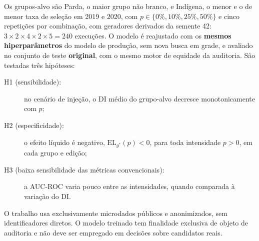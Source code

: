Os grupos-alvo são Parda, o maior grupo não branco, e Indígena, o menor e o de menor taxa de seleção em 2019 e 2020, com $p \in \{0\%, 10\%, 25\%, 50\%\}$ e cinco repetições por combinação, com geradores derivados da semente 42: $3 \times 2 \times 4 \times 2 \times 5 = 240$ execuções. O modelo é reajustado com os \textbf{mesmos hiperparâmetros} do modelo de produção, sem nova busca em grade, e avaliado no conjunto de teste \textbf{original}, com o mesmo motor de equidade da auditoria. São testadas três hipóteses:
\begin{description}
    \item[H1 (sensibilidade):] no cenário de injeção, o DI médio do grupo-alvo decresce monotonicamente com $p$;
    \item[H2 (especificidade):] o efeito líquido é negativo, $\mathrm{EL}_{g^{*}}(p) < 0$, para toda intensidade $p > 0$, em cada grupo e edição;
    \item[H3 (baixa sensibilidade das métricas convencionais):] a AUC-ROC varia pouco entre as intensidades, quando comparada à variação do DI.
\end{description}

O trabalho usa exclusivamente microdados públicos e anonimizados, sem identificadores diretos. O modelo treinado tem finalidade exclusiva de objeto de auditoria e não deve ser empregado em decisões sobre candidatos reais.
